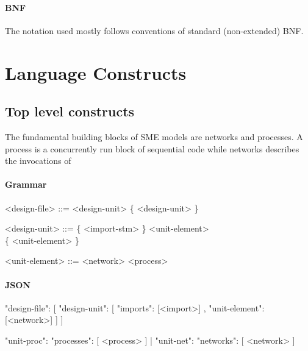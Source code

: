 \documentclass{article}
\begin{document}
\paragraph{BNF} The notation used mostly follows conventions of standard
(non-extended) BNF.




\section{Language Constructs}

\setlength{\grammarindent}{10em} %

\subsection{Top level constructs}

The fundamental building blocks of SME models are networks and processes. A
process is a concurrently run block of sequential code while networks describes
the invocations of

\paragraph{Grammar}

\begin{grammar}
  <design-file> ::= <design-unit> \{ <design-unit> \}

  <design-unit> ::= \{ <import-stm> \} <unit-element> \\ \{ <unit-element> \}

  <unit-element> ::= <network>
  \alt <process>
\end{grammar}

\paragraph{JSON}

\begin{jsoncode}
{ "design-file": [
  {"design-unit":
    [ { "imports": [<import>]
      , "unit-element": [<network>]
      }
    ]
  }
  ]
}

{ "unit-proc": { "processes":  [ <process> ] }
| "unit-net": { "networks": [ <network> ] }
}
\end{jsoncode}
\end{document}
